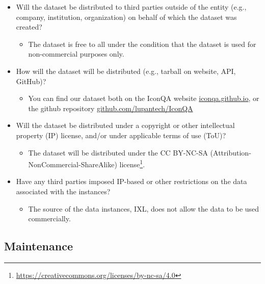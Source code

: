 \documentclass{article}
\begin{document}
\begin{itemize}
    \item Will the dataset be distributed to third parties outside of the entity (e.g., company, institution, organization) on behalf of which the dataset was created?
    \begin{itemize}
        \item The dataset is free to all under the condition that the dataset is used for non-commercial purposes only.
    \end{itemize}
    \item How will the dataset will be distributed (e.g., tarball on website, API, GitHub)?
    \begin{itemize}
        \item You can find our dataset both on the IconQA website \url{iconqa.github.io}, or the github repository \url{github.com/lupantech/IconQA}
    \end{itemize}
    \item Will the dataset be distributed under a copyright or other intellectual property (IP) license, and/or under applicable terms of use (ToU)?
    \begin{itemize}
        \item The dataset will be distributed under the CC BY-NC-SA (Attribution-NonCommercial-ShareAlike) license\footnote{\url{https://creativecommons.org/licenses/by-nc-sa/4.0}}.
    \end{itemize}
    \item Have any third parties imposed IP-based or other restrictions on the data associated with the instances?
    \begin{itemize}
        \item The source of the data instances, IXL, does not allow the data to be used commercially.
    \end{itemize}

\end{itemize}

\subsection{Maintenance}
\end{document}
